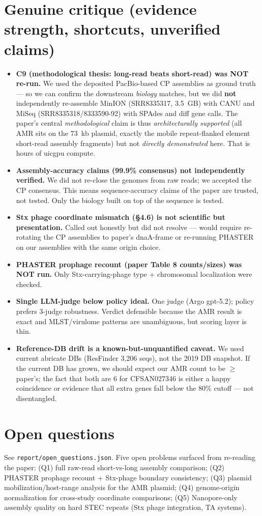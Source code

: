 \documentclass[11pt]{article}
\begin{document}
\section{Genuine critique (evidence strength, shortcuts, unverified claims)}
\begin{itemize}[leftmargin=1.4em]
\item \textbf{C9 (methodological thesis: long-read beats short-read) was NOT re-run.} We
used the deposited PacBio-based CP assemblies as ground truth --- so we can confirm the
downstream \emph{biology} matches, but we did \textbf{not} independently re-assemble MinION
(SRR8335317, 3.5~GB) with CANU and MiSeq (SRR8335318/8333590-92) with SPAdes and diff
gene calls. The paper's central \emph{methodological} claim is thus \emph{architecturally
supported} (all AMR sits on the 73~kb plasmid, exactly the mobile repeat-flanked element
short-read assembly fragments) but not \emph{directly demonstrated} here. That is hours of
uicgpu compute.
\item \textbf{Assembly-accuracy claims (99.9\% consensus) not independently verified.} We
did not re-close the genomes from raw reads; we accepted the CP consensus. This means
sequence-accuracy claims of the paper are trusted, not tested. Only the biology built on
top of the sequence is tested.
\item \textbf{Stx phage coordinate mismatch (§4.6) is not scientific but presentation.}
Called out honestly but did not resolve --- would require re-rotating the CP assemblies to
paper's dnaA-frame or re-running PHASTER on our assemblies with the same origin choice.
\item \textbf{PHASTER prophage recount (paper Table 8 counts/sizes) was NOT run.} Only
Stx-carrying-phage type + chromosomal localization were checked.
\item \textbf{Single LLM-judge below policy ideal.} One judge (Argo gpt-5.2); policy prefers
3-judge robustness. Verdict defensible because the AMR result is exact and MLST/virulome
patterns are unambiguous, but scoring layer is thin.
\item \textbf{Reference-DB drift is a known-but-unquantified caveat.} We used current abricate
DBs (ResFinder 3{,}206 seqs), not the 2019 DB snapshot. If the current DB has grown, we
should expect our AMR count to be $\geq$ paper's; the fact that both are 6 for CFSAN027346
is either a happy coincidence or evidence that all extra genes fall below the 80\% cutoff
--- not disentangled.
\end{itemize}

\section{Open questions}
See \texttt{report/open\_questions.json}. Five open problems surfaced from re-reading the
paper: (Q1) full raw-read short-vs-long assembly comparison; (Q2) PHASTER prophage recount +
Stx-phage boundary consistency; (Q3) plasmid mobilization/host-range analysis for the AMR
plasmid; (Q4) genome-origin normalization for cross-study coordinate comparisons; (Q5)
Nanopore-only assembly quality on hard STEC repeats (Stx phage integration, TA systems).
\end{document}

